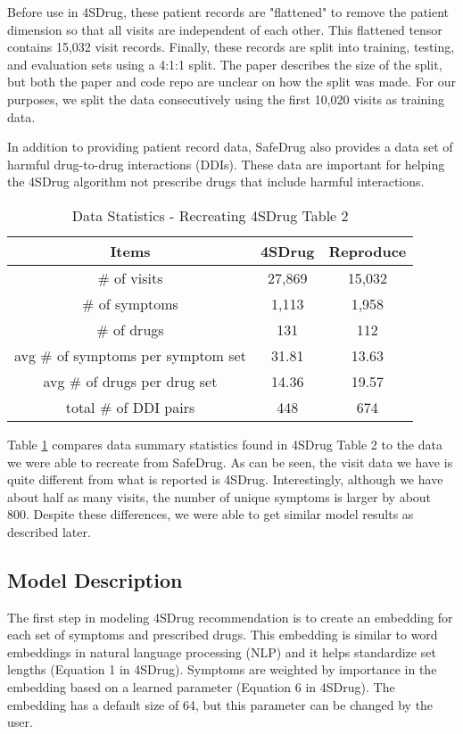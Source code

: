 \documentclass[letterpaper]{article} %
\begin{document}
Before use in 4SDrug, these patient records are "flattened" to remove the patient dimension so that all visits are independent of each other. This flattened tensor contains 15,032 visit records. Finally, these records are split into training, testing, and evaluation sets using a 4:1:1 split. The paper describes the size of the split, but both the paper and code repo are unclear on how the split was made. For our purposes, we split the data consecutively using the first 10,020 visits as training data.  

In addition to providing patient record data, SafeDrug also provides a data set of harmful drug-to-drug interactions (DDIs). These data are important for helping the 4SDrug algorithm not prescribe drugs that include harmful interactions.

\begin{table}[t]
\centering
\begin{tabular}{c|c c}
Items & 4SDrug & Reproduce \\ 
\hline
\# of visits & 27,869 &  15,032 \\
\# of symptoms & 1,113 & 1,958 \\
\# of drugs & 131 & 112  \\
avg \# of symptoms per symptom set & 31.81 & 13.63  \\
avg \# of drugs per drug set & 14.36 & 19.57  \\
total \# of DDI pairs & 448 & 674  
\end{tabular}
\caption{Data Statistics - Recreating 4SDrug Table 2}
\label{table1}
\end{table}

Table \ref{table1} compares data summary statistics found in 4SDrug Table 2 to the data we were able to recreate from SafeDrug. As can be seen, the visit data we have is quite different from what is reported is 4SDrug. Interestingly, although we have about half as many visits, the number of unique symptoms is larger by about 800. Despite these differences, we were able to get similar model results as described later.

\subsection{Model Description}

The first step in modeling 4SDrug recommendation is to create an embedding for each set of symptoms and prescribed drugs. This embedding is similar to word embeddings in natural language processing (NLP) and it helps standardize set lengths (Equation 1 in 4SDrug). Symptoms are weighted by importance in the embedding based on a learned parameter (Equation 6 in 4SDrug). The embedding has a default size of 64, but this parameter can be changed by the user.
\end{document}
